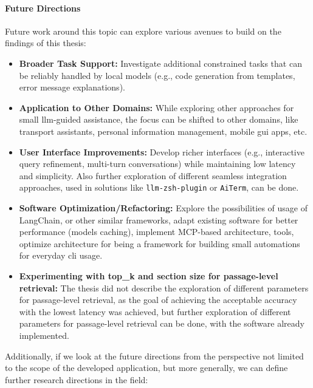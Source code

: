 \paragraph{Future Directions}
Future work around this topic can explore various avenues to build on the
findings of this thesis:
\begin{itemize}
  \item \textbf{Broader Task Support:} Investigate additional constrained tasks
    that can be reliably handled by local models (e.g., code generation from
    templates, error message explanations).
  \item \textbf{Application to Other Domains:} While exploring other approaches
    for small \gls{llm}-guided assistance, the focus can be shifted to other
    domains, like transport assistants, personal information management,
    mobile \gls{gui} apps, etc.
  \item \textbf{User Interface Improvements:} Develop richer interfaces (e.g.,
    interactive query refinement, multi-turn conversations) while maintaining
    low latency and simplicity. Also further exploration of different seamless
    integration approaches, used in solutions like \texttt{llm-zsh-plugin}
    or \texttt{AiTerm}, can be done.
  \item \textbf{Software Optimization/Refactoring:} Explore the possibilities of
    usage of LangChain, or other similar frameworks, adapt existing software
    for better performance (models caching), implement MCP-based architecture,
    tools, optimize architecture for being a framework for building small
    automations for everyday \gls{cli} usage.
  \item \textbf{Experimenting with top\_k and section size for passage-level
      retrieval:} The thesis did not describe the exploration of different
        parameters for passage-level retrieval, as the goal of achieving the
        acceptable accuracy with the lowest latency was achieved, but further
        exploration of different parameters for passage-level retrieval can be
        done, with the software already implemented.
\end{itemize}
Additionally, if we look at the future directions from the perspective not
limited to the scope of the developed application, but more generally, we can
define further research directions in the field:
